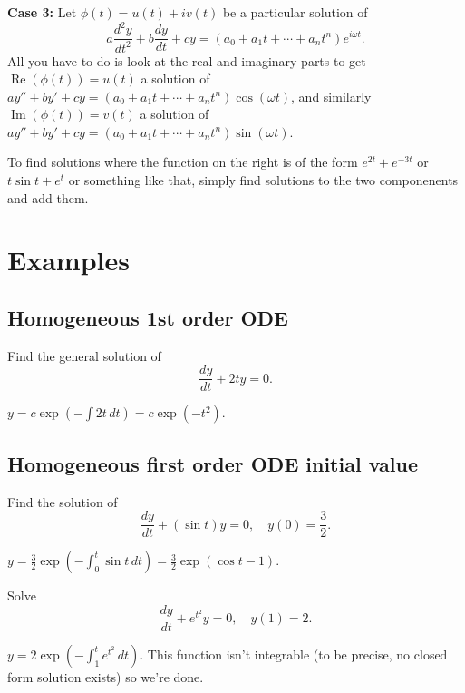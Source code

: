\noindent\textbf{Case 3:} Let $\phi(t)=u(t)+iv(t)$ be a particular solution of  \[
    a \frac{d^2y}{dt^2}+b \frac{dy}{dt}+cy=(a_0+a_1t+\cdots+a_nt^n)e^{i\omega t}.
\] All you have to do is look at the real and imaginary parts to get $\operatorname{Re}(\phi(t))=u(t)$ a solution of $ay''+by'+cy=(a_0+a_1t+\cdots+a_nt^n)\cos(\omega t)$, and similarly $\operatorname{Im}(\phi(t))=v(t)$ a solution of $ay''+by'+cy=(a_0+a_1t+\cdots+a_nt^n)\sin(\omega t)$.
\begin{remark}
    To find solutions where the function on the right is of the form $e^{2t}+e^{-3t}$ or $t\sin t +e^{t}$ or something like that, simply find solutions to the two componenents and add them.
\end{remark}




\section{Examples}
\subsection{Homogeneous 1st order ODE}
\begin{prob}
    Find the general solution of \[
    \frac{dy}{dt}+2ty=0.
    \] 
\end{prob}
\begin{solution}
    $y=c \exp \left(-\int 2t \, dt  \right) =c\exp\left( -t^2 \right) $.
\end{solution}
\subsection{Homogeneous first order ODE initial value}
\begin{prob}
    Find the solution of \[
        \frac{dy}{dt}+(\sin t)y=0,\quad y(0)=\frac{3}{2}.
    \] 
\end{prob}
\begin{solution}
    $y=\frac{3}{2}\exp\left( -\int_{0}^{t} \sin t \, dt \right) =\frac{3}{2}\exp(\cos t -1)$.
\end{solution}
\begin{prob}
    Solve \[
        \frac{dy}{dt}+e^{t^2}y=0,\quad y(1)=2.
    \] 
\end{prob}
\begin{solution}
    $y=2\exp\left( -\int_{1}^{t} e^{t^2} \, dt \right) $. This function isn't integrable (to be precise, no closed form solution exists) so we're done.
\end{solution}
